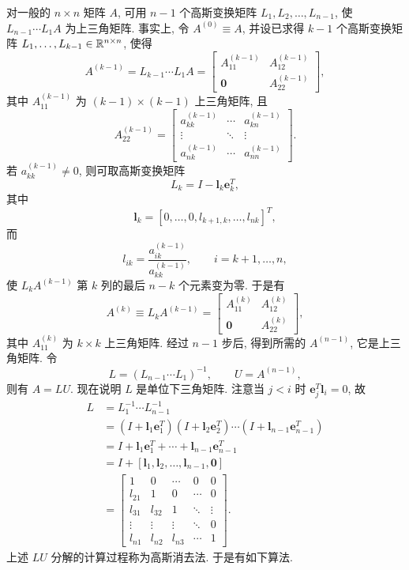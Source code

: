 对一般的 $n\times n$ 矩阵 $A$, 可用 $n-1$ 个高斯变换矩阵 $L_1,L_2,\ldots,L_{n-1}$, 使 $L_{n-1}\cdots L_1A$ 为上三角矩阵. 事实上, 令 $A^{(0)}\equiv A$, 并设已求得 $k-1$ 个高斯变换矩阵 $L_1,\ldots,L_{k-1}\in\mathbb{R}^{n\times n}$, 使得
\[
  A^{(k-1)}=L_{k-1}\cdots L_1A=
  \begin{bmatrix}
    A_{11}^{(k-1)} & A_{12}^{(k-1)}\\
    \mathbf{0}     & A_{22}^{(k-1)}
  \end{bmatrix},
\]
其中 $A_{11}^{(k-1)}$ 为 $(k-1)\times(k-1)$ 上三角矩阵, 且
\[
  A_{22}^{(k-1)}=
  \begin{bmatrix}
    a_{kk}^{(k-1)} & \cdots & a_{kn}^{(k-1)}\\
    \vdots         & \ddots & \vdots\\
    a_{nk}^{(k-1)} & \cdots & a_{nn}^{(k-1)}
  \end{bmatrix}.
\]
若 $a_{kk}^{(k-1)}\neq0$, 则可取高斯变换矩阵
\[
  L_k=I-\mathbf{l}_k\mathbf{e}_k^T,
\]
其中
\[
  \mathbf{l}_k=[0,\ldots,0,l_{k+1,k},\ldots,l_{nk}]^T,
\]
而
\[
  l_{ik}=\frac{a_{ik}^{(k-1)}}{a_{kk}^{(k-1)}},\qquad i=k+1,\ldots,n,
\]
使 $L_kA^{(k-1)}$ 第 $k$ 列的最后 $n-k$ 个元素变为零. 于是有
\[
  A^{(k)}\equiv L_kA^{(k-1)}=
  \begin{bmatrix}
    A_{11}^{(k)} & A_{12}^{(k)}\\
    \mathbf{0}   & A_{22}^{(k)}
  \end{bmatrix},
\]
其中 $A_{11}^{(k)}$ 为 $k\times k$ 上三角矩阵. 经过 $n-1$ 步后, 得到所需的 $A^{(n-1)}$, 它是上三角矩阵. 令
\[
  L=(L_{n-1}\cdots L_1)^{-1},\qquad U=A^{(n-1)},
\]
则有 $A=LU$. 现在说明 $L$ 是单位下三角矩阵. 注意当 $j<i$ 时 $\mathbf{e}_j^T\mathbf{l}_i=0$, 故
\[
  \begin{aligned}
    L
    &=L_1^{-1}\cdots L_{n-1}^{-1}\\
    &=(I+\mathbf{l}_1\mathbf{e}_1^T)(I+\mathbf{l}_2\mathbf{e}_2^T)\cdots(I+\mathbf{l}_{n-1}\mathbf{e}_{n-1}^T)\\
    &=I+\mathbf{l}_1\mathbf{e}_1^T+\cdots+\mathbf{l}_{n-1}\mathbf{e}_{n-1}^T\\
    &=I+[\mathbf{l}_1,\mathbf{l}_2,\ldots,\mathbf{l}_{n-1},\mathbf{0}]\\
    &=
    \begin{bmatrix}
      1      & 0      & \cdots & 0      & 0 \\
      l_{21} & 1      & 0      & \cdots & 0 \\
      l_{31} & l_{32} & 1      & \ddots & \vdots \\
      \vdots & \vdots & \vdots & \ddots & 0 \\
      l_{n1} & l_{n2} & l_{n3} & \cdots & 1
    \end{bmatrix}.
  \end{aligned}
\]
上述 $LU$ 分解的计算过程称为高斯消去法. 于是有如下算法.


